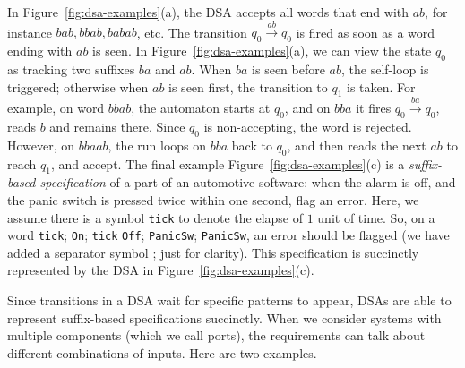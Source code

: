 \documentclass[runningheads,envcountsame]{llncs}
\newcommand{\xra}{\xrightarrow}
\begin{document}
  In Figure~\ref{fig:dsa-examples}(a), the DSA accepts all words that end with $ab$, for instance $bab, bbab, babab$, etc. The transition $q_0 \xra{ab} q_0$ is fired as soon as a word ending with $ab$ is seen. In Figure~\ref{fig:dsa-examples}(a), we can view the state $q_0$ as tracking two suffixes $ba$ and $ab$. When $ba$ is seen before $ab$, the self-loop is triggered; otherwise when $ab$ is seen first, the transition to $q_1$ is taken. For example, on word $bbab$, the automaton starts at $q_0$, and on $bba$ it fires $q_0 \xra{ba} q_0$, reads $b$ and remains there. Since $q_0$ is non-accepting, the word is rejected. However, on $bbaab$, the run loops on $bba$ back to $q_0$, and then reads the next $ab$ to reach $q_1$, and accept. The final example Figure~\ref{fig:dsa-examples}(c) is a \emph{suffix-based specification} of a part of an automotive software: when the alarm is off, and the panic switch is pressed twice within one second, flag an error. Here, we assume there is a symbol \texttt{tick} to denote the elapse of $1$ unit of time. So, on a word \texttt{tick}; \texttt{On}; \texttt{tick} \texttt{Off}; \texttt{PanicSw}; \texttt{PanicSw}, an error should be flagged (we have added a separator symbol ; just for clarity). This specification is succinctly represented by the DSA in Figure~\ref{fig:dsa-examples}(c).

   Since transitions in a DSA wait for specific patterns to appear, DSAs are able to represent suffix-based specifications succinctly. When we consider systems with multiple components (which we call ports), the requirements can talk about different combinations of inputs. Here are two examples. 
\end{document}
